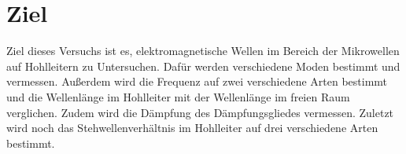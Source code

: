 \section{Ziel}
\label{sec:Ziel}

Ziel dieses Versuchs ist es, elektromagnetische Wellen im Bereich der Mikrowellen
auf Hohlleitern zu Untersuchen. Dafür werden verschiedene Moden bestimmt und
vermessen. Außerdem wird die Frequenz auf zwei verschiedene Arten bestimmt und
die Wellenlänge im Hohlleiter mit der Wellenlänge im freien Raum verglichen. Zudem
wird die Dämpfung des Dämpfungsgliedes vermessen. Zuletzt wird noch das
Stehwellenverhältnis im Hohlleiter auf drei verschiedene Arten bestimmt.
